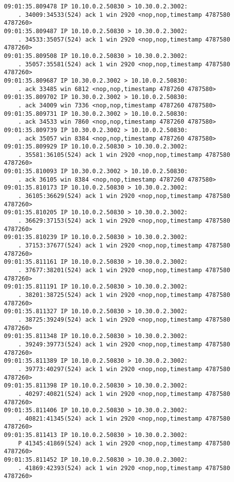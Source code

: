 \documentclass[a4paper,12pt]{article}
\begin{document}
\begin{Verbatim}
09:01:35.809478 IP 10.10.0.2.50830 > 10.30.0.2.3002: 
    . 34009:34533(524) ack 1 win 2920 <nop,nop,timestamp 4787580 4787260>
09:01:35.809487 IP 10.10.0.2.50830 > 10.30.0.2.3002: 
    . 34533:35057(524) ack 1 win 2920 <nop,nop,timestamp 4787580 4787260>
09:01:35.809508 IP 10.10.0.2.50830 > 10.30.0.2.3002: 
    . 35057:35581(524) ack 1 win 2920 <nop,nop,timestamp 4787580 4787260>
09:01:35.809687 IP 10.30.0.2.3002 > 10.10.0.2.50830: 
    . ack 33485 win 6812 <nop,nop,timestamp 4787260 4787580>
09:01:35.809702 IP 10.30.0.2.3002 > 10.10.0.2.50830: 
    . ack 34009 win 7336 <nop,nop,timestamp 4787260 4787580>
09:01:35.809731 IP 10.30.0.2.3002 > 10.10.0.2.50830: 
    . ack 34533 win 7860 <nop,nop,timestamp 4787260 4787580>
09:01:35.809739 IP 10.30.0.2.3002 > 10.10.0.2.50830: 
    . ack 35057 win 8384 <nop,nop,timestamp 4787260 4787580>
09:01:35.809929 IP 10.10.0.2.50830 > 10.30.0.2.3002: 
    . 35581:36105(524) ack 1 win 2920 <nop,nop,timestamp 4787580 4787260>
09:01:35.810093 IP 10.30.0.2.3002 > 10.10.0.2.50830: 
    . ack 36105 win 8384 <nop,nop,timestamp 4787260 4787580>
09:01:35.810173 IP 10.10.0.2.50830 > 10.30.0.2.3002: 
    . 36105:36629(524) ack 1 win 2920 <nop,nop,timestamp 4787580 4787260>
09:01:35.810205 IP 10.10.0.2.50830 > 10.30.0.2.3002: 
    . 36629:37153(524) ack 1 win 2920 <nop,nop,timestamp 4787580 4787260>
09:01:35.810239 IP 10.10.0.2.50830 > 10.30.0.2.3002: 
    . 37153:37677(524) ack 1 win 2920 <nop,nop,timestamp 4787580 4787260>
09:01:35.811161 IP 10.10.0.2.50830 > 10.30.0.2.3002: 
    . 37677:38201(524) ack 1 win 2920 <nop,nop,timestamp 4787580 4787260>
09:01:35.811191 IP 10.10.0.2.50830 > 10.30.0.2.3002: 
    . 38201:38725(524) ack 1 win 2920 <nop,nop,timestamp 4787580 4787260>
09:01:35.811327 IP 10.10.0.2.50830 > 10.30.0.2.3002: 
    . 38725:39249(524) ack 1 win 2920 <nop,nop,timestamp 4787580 4787260>
09:01:35.811348 IP 10.10.0.2.50830 > 10.30.0.2.3002: 
    . 39249:39773(524) ack 1 win 2920 <nop,nop,timestamp 4787580 4787260>
09:01:35.811389 IP 10.10.0.2.50830 > 10.30.0.2.3002: 
    . 39773:40297(524) ack 1 win 2920 <nop,nop,timestamp 4787580 4787260>
09:01:35.811398 IP 10.10.0.2.50830 > 10.30.0.2.3002: 
    . 40297:40821(524) ack 1 win 2920 <nop,nop,timestamp 4787580 4787260>
09:01:35.811406 IP 10.10.0.2.50830 > 10.30.0.2.3002: 
    . 40821:41345(524) ack 1 win 2920 <nop,nop,timestamp 4787580 4787260>
09:01:35.811413 IP 10.10.0.2.50830 > 10.30.0.2.3002: 
    P 41345:41869(524) ack 1 win 2920 <nop,nop,timestamp 4787580 4787260>
09:01:35.811452 IP 10.10.0.2.50830 > 10.30.0.2.3002: 
    . 41869:42393(524) ack 1 win 2920 <nop,nop,timestamp 4787580 4787260>

\end{Verbatim}
\end{document}
